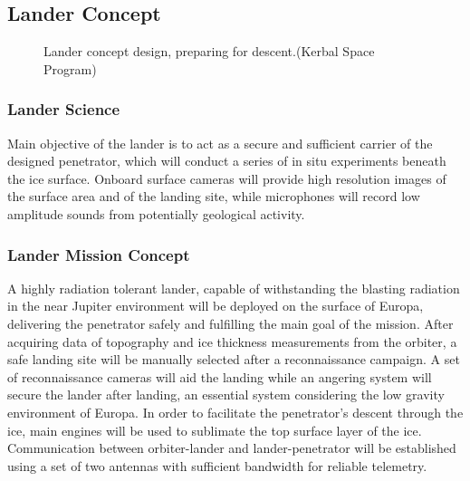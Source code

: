 \subsection{Lander Concept}

\begin{figure}[htb!]
    \centering
    \captionsetup[subfigure]{width=0.45\textwidth}
    \caption{Lander concept design, preparing for descent.(Kerbal Space Program)}
\end{figure}

\subsubsection{Lander Science}

Main objective of the lander is to act as a secure and sufficient carrier of the designed penetrator, which will conduct a series of in situ experiments beneath the ice surface. Onboard surface cameras will provide high resolution images of the surface area and of the landing site, while microphones will record low amplitude sounds from potentially geological activity.

\subsubsection{Lander Mission Concept}
A highly radiation tolerant lander, capable of withstanding the blasting radiation in the near Jupiter environment will be deployed on the surface of Europa, delivering the penetrator safely and fulfilling the main goal of the mission. 
After acquiring data of topography and ice thickness measurements from the orbiter, a safe landing site will be manually selected after a reconnaissance campaign. A set of reconnaissance cameras will aid the landing while an angering system will secure the lander after landing, an essential system considering the low gravity environment of Europa. In order to facilitate the penetrator’s descent through the ice, main engines will be used to sublimate the top surface layer of the ice. Communication between orbiter-lander and lander-penetrator will be established using a set of two antennas with sufficient bandwidth for reliable telemetry.

